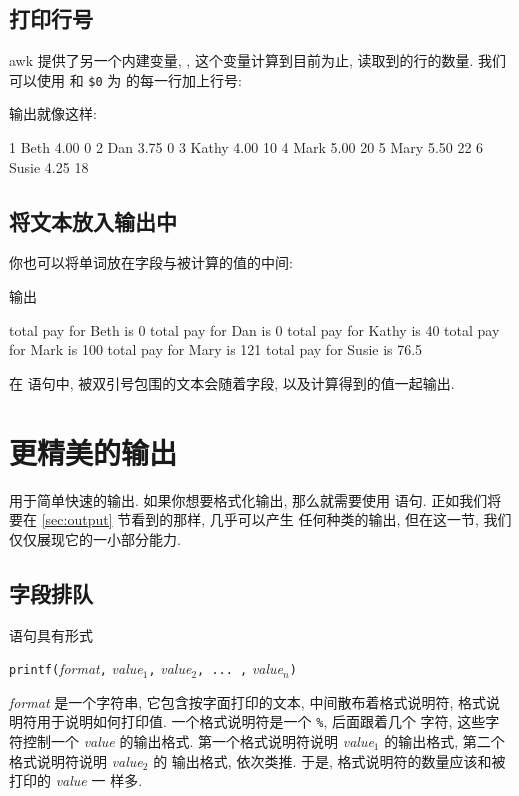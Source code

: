 \subsection{打印行号}
\label{subsec:printing_line_numbers}

awk 提供了另一个内建变量, \nr, 这个变量计算到目前为止, 读取到的行的数量.
我们可以使用 \nr 和 \verb'$0' 为  的每一行加上行号:
输出就像这样:
\begin{file}
    1 Beth    4.00    0
    2 Dan     3.75    0
    3 Kathy   4.00    10
    4 Mark    5.00    20
    5 Mary    5.50    22
    6 Susie   4.25    18
\end{file}

\subsection{将文本放入输出中}
\label{subsec:putting_text_in_the_output}

你也可以将单词放在字段与被计算的值的中间:
输出
\begin{file}
    total pay for Beth is 0
    total pay for Dan is 0
    total pay for Kathy is 40
    total pay for Mark is 100
    total pay for Mary is 121
    total pay for Susie is 76.5
\end{file}
在 \print 语句中, 被双引号包围的文本会随着字段, 以及计算得到的值一起输出.

\section{更精美的输出}
\label{sec:fancier_output}

\print 用于简单快速的输出. 如果你想要格式化输出, 那么就需要使用 \printf
语句. 正如我们将要在 \ref{sec:output} 节看到的那样, \printf 几乎可以产生
任何种类的输出, 但在这一节, 我们仅仅展现它的一小部分能力.

\subsection{字段排队}
\label{subsec:lining_up_fields}

\printf 语句具有形式
\begin{pattern}
    \texttt{printf(}\textit{format}\texttt{,} \textit{value$_1$}\texttt{,}
    \textit{value$_2$}\texttt{, ... ,} \textit{value$_n$}\texttt{)}
\end{pattern}
\textit{format} 是一个字符串, 它包含按字面打印的文本, 中间散布着格式说明符,
格式说明符用于说明如何打印值. 一个格式说明符是一个 \verb'%', 后面跟着几个
字符, 这些字符控制一个 \textit{value} 的输出格式. 第一个格式说明符说明
\textit{value$_1$} 的输出格式, 第二个格式说明符说明 \textit{value$_2$} 的
输出格式, 依次类推. 于是, 格式说明符的数量应该和被打印的 \textit{value} 一
样多.

